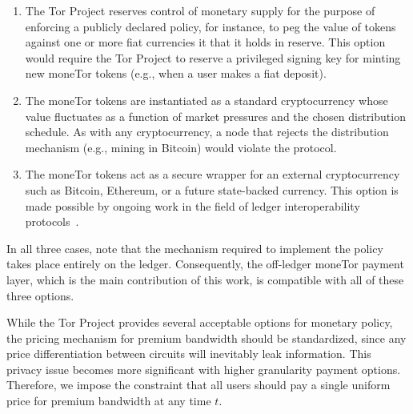 \begin{enumerate}

\item The Tor Project reserves control of monetary supply for the purpose of enforcing a publicly declared policy, for instance, to peg the value of tokens against one or more fiat currencies it that it holds in reserve.
This option would require the Tor Project to reserve a privileged signing key for minting new moneTor tokens (e.g.,
when a user makes a fiat deposit).
\item The moneTor tokens are instantiated as a standard cryptocurrency whose value fluctuates as a function of market pressures and the chosen distribution schedule.
As with any cryptocurrency, a node that rejects the distribution mechanism (e.g.,
mining in Bitcoin) would violate the protocol.
\item The moneTor tokens act as a secure wrapper for an external cryptocurrency such as Bitcoin, Ethereum, or a future state-backed currency.
This option is made possible by ongoing work in the field of ledger interoperability protocols~\cite{back2014enabling,poon2017plasma}.

\end{enumerate}

In all three cases, note that the mechanism required to implement the policy takes place entirely on the ledger.
Consequently, the off-ledger moneTor payment layer, which is the main contribution of this work, is compatible with all of these three options.

While the Tor Project provides several acceptable options for monetary policy, the pricing mechanism for premium bandwidth should be standardized, since any price differentiation between circuits will inevitably leak information.
This privacy issue becomes more significant with higher granularity payment options.
Therefore, we impose the constraint that all users should pay a single uniform price for premium bandwidth at any time $t$.

